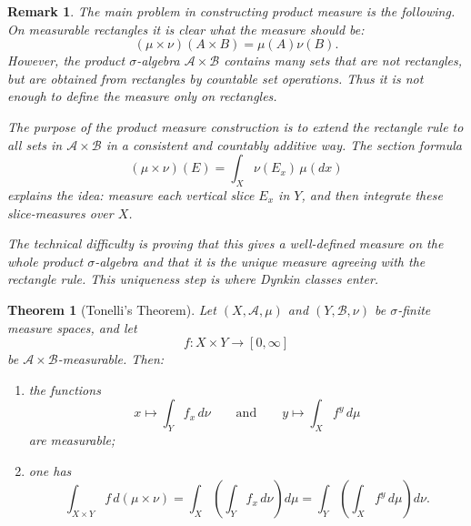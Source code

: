 \documentclass[12pt]{article}
\newtheorem{theorem}{Theorem}
\newtheorem{remark}{Remark}
\begin{document}
\begin{remark}
The main problem in constructing product measure is the following. On measurable
rectangles it is clear what the measure should be:
\[
(\mu\times\nu)(A\times B)=\mu(A)\nu(B).
\]
However, the product $\sigma$-algebra $\mathcal{A}\times\mathcal{B}$ contains
many sets that are not rectangles, but are obtained from rectangles by countable
set operations. Thus it is not enough to define the measure only on rectangles.

The purpose of the product measure construction is to extend the rectangle rule
to all sets in $\mathcal{A}\times\mathcal{B}$ in a consistent and countably
additive way. The section formula
\[
(\mu\times\nu)(E)=\int_X \nu(E_x)\,\mu(dx)
\]
explains the idea: measure each vertical slice $E_x$ in $Y$, and then integrate
these slice-measures over $X$.

The technical difficulty is proving that this gives a well-defined measure on
the whole product $\sigma$-algebra and that it is the unique measure agreeing
with the rectangle rule. This uniqueness step is where Dynkin classes enter.
\end{remark}

\begin{theorem}[Tonelli's Theorem]
Let $(X,\mathcal{A},\mu)$ and $(Y,\mathcal{B},\nu)$ be $\sigma$-finite measure
spaces, and let
\[
f:X\times Y\to[0,\infty]
\]
be $\mathcal{A}\times\mathcal{B}$-measurable. Then:
\begin{enumerate}[label=(\alph*)]
    \item the functions
    \[
    x\mapsto \int_Y f_x\,d\nu
    \qquad\text{and}\qquad
    y\mapsto \int_X f^y\,d\mu
    \]
    are measurable;
    \item one has
    \[
    \int_{X\times Y} f\,d(\mu\times\nu)
    =
    \int_X\left(\int_Y f_x\,d\nu\right)d\mu
    =
    \int_Y\left(\int_X f^y\,d\mu\right)d\nu.
    \]
\end{enumerate}
\end{theorem}
\end{document}
